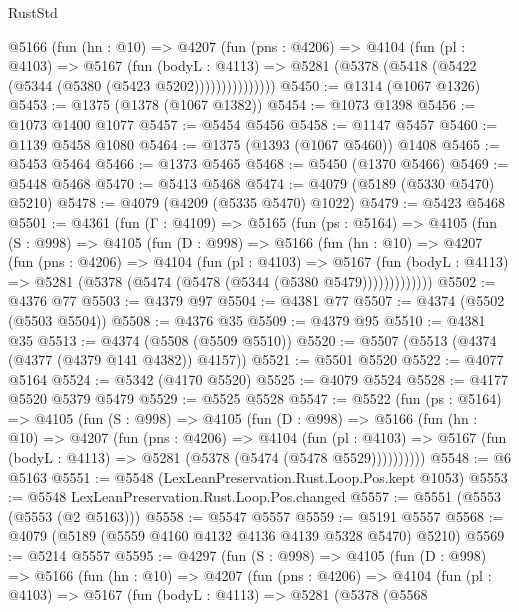 \begin{lexlean}{RustStd}
\begin{coremodule}
{\begin{coremodule}
{{{{{{{{{{{{{{            @5166
              (fun (hn : @10) =>
              @4207
                (fun (pns : @4206) =>
                @4104
                  (fun (pl : @4103) =>
                  @5167
                    (fun (bodyL : @4113) =>
                    @5281 (@5378 (@5418 (@5422 (@5344 (@5380 (@5423 @5202)))))))))))))))
@5450 := @1314 (@1067 @1326)
@5453 := @1375 (@1378 (@1067 @1382))
@5454 := @1073 @1398
@5456 := @1073 @1400 @1077
@5457 := @5454 @5456
@5458 := @1147 @5457
@5460 := @1139 @5458 @1080
@5464 := @1375 (@1393 (@1067 @5460)) @1408
@5465 := @5453 @5464
@5466 := @1373 @5465
@5468 := @5450 (@1370 @5466)
@5469 := @5448 @5468
@5470 := @5413 @5468
@5474 := @4079 (@5189 (@5330 @5470) @5210)
@5478 := @4079 (@4209 (@5335 @5470) @1022)
@5479 := @5423 @5468
@5501 := @4361
    (fun (Γ : @4109) =>
    @5165
      (fun (ps : @5164) =>
      @4105
        (fun (S : @998) =>
        @4105
          (fun (D : @998) =>
          @5166
            (fun (hn : @10) =>
            @4207
              (fun (pns : @4206) =>
              @4104
                (fun (pl : @4103) =>
                @5167
                  (fun (bodyL : @4113) =>
                  @5281 (@5378 (@5474 (@5478 (@5344 (@5380 @5479)))))))))))))
@5502 := @4376 @77
@5503 := @4379 @97
@5504 := @4381 @77
@5507 := @4374 (@5502 (@5503 @5504))
@5508 := @4376 @35
@5509 := @4379 @95
@5510 := @4381 @35
@5513 := @4374 (@5508 (@5509 @5510))
@5520 := @5507 (@5513 (@4374 (@4377 (@4379 @141 @4382)) @4157))
@5521 := @5501 @5520
@5522 := @4077 @5164
@5524 := @5342 (@4170 @5520)
@5525 := @4079 @5524
@5528 := @4177 @5520 @5379 @5479
@5529 := @5525 @5528
@5547 := @5522
    (fun (ps : @5164) =>
    @4105
      (fun (S : @998) =>
      @4105
        (fun (D : @998) =>
        @5166
          (fun (hn : @10) =>
          @4207
            (fun (pns : @4206) =>
            @4104
              (fun (pl : @4103) =>
              @5167 (fun (bodyL : @4113) => @5281 (@5378 (@5474 (@5478 @5529))))))))))
@5548 := @6 @5163
@5551 := @5548 (LexLeanPreservation.Rust.Loop.Pos.kept @1053)
@5553 := @5548 LexLeanPreservation.Rust.Loop.Pos.changed
@5557 := @5551 (@5553 (@5553 (@2 @5163)))
@5558 := @5547 @5557
@5559 := @5191 @5557
@5568 := @4079 (@5189 (@5559 @4160 @4132 @4136 @4139 @5328 @5470) @5210)
@5569 := @5214 @5557
@5595 := @4297
    (fun (S : @998) =>
    @4105
      (fun (D : @998) =>
      @5166
        (fun (hn : @10) =>
        @4207
          (fun (pns : @4206) =>
          @4104
            (fun (pl : @4103) =>
            @5167
              (fun (bodyL : @4113) =>
              @5281
                (@5378
                  (@5568
}}}}}}}}}}}}}}
\end{coremodule}}
\end{coremodule}
\end{lexlean}
